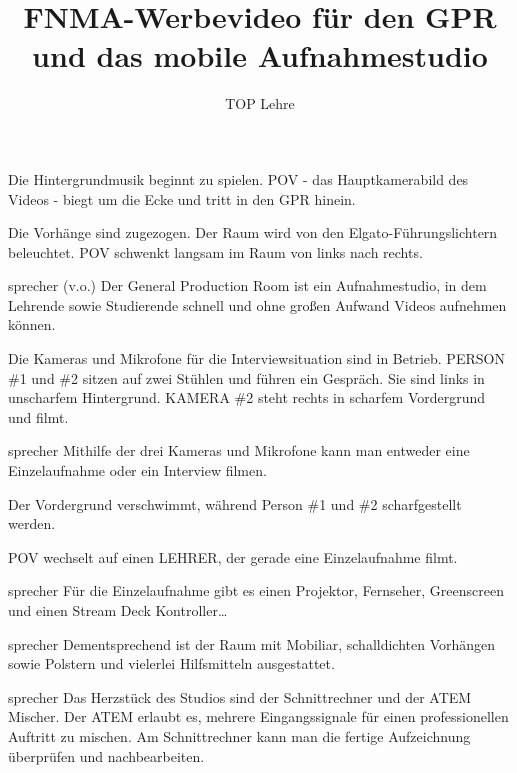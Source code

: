 \documentclass{screenplay}
\title{FNMA-Werbevideo für den GPR und das mobile Aufnahmestudio}
\author{TOP Lehre}
\begin{document}
	\coverpage
	\fadein
	
	
	Die Hintergrundmusik beginnt zu spielen. POV - das Hauptkamerabild des Videos - biegt um die Ecke und tritt in den GPR hinein.
	
	
	Die Vorhänge sind zugezogen. Der Raum wird von den Elgato-Führungslichtern beleuchtet. POV schwenkt langsam im Raum von links nach rechts.
	
	\begin{dialogue}{sprecher (v.o.)}
		Der General Production Room ist ein Aufnahmestudio, in dem Lehrende sowie Studierende schnell und ohne großen Aufwand Videos aufnehmen können.
	\end{dialogue}
	
	Die Kameras und Mikrofone für die Interviewsituation sind in Betrieb. PERSON \#1 und \#2 sitzen auf zwei Stühlen und führen ein Gespräch. Sie sind links in unscharfem Hintergrund. KAMERA \#2 steht rechts in scharfem Vordergrund und filmt.
	
	\begin{dialogue}{sprecher}
		Mithilfe der drei Kameras und Mikrofone kann man entweder eine Einzelaufnahme oder ein Interview filmen.
	\end{dialogue}
	
	Der Vordergrund verschwimmt, während Person \#1 und \#2 scharfgestellt werden.
	
	POV wechselt auf einen LEHRER, der gerade eine Einzelaufnahme filmt.
	
	\begin{dialogue}{sprecher}
		Für die Einzelaufnahme gibt es einen Projektor, Fernseher, Greenscreen und einen Stream Deck Kontroller\ldots
	\end{dialogue}
	
	\begin{dialogue}{sprecher}
		Dementsprechend ist der Raum mit Mobiliar, schalldichten Vorhängen sowie Polstern und vielerlei Hilfsmitteln ausgestattet.
	\end{dialogue}
	
	\begin{dialogue}{sprecher}
		Das Herzstück des Studios sind der Schnittrechner und der ATEM Mischer. Der ATEM erlaubt es, mehrere Eingangssignale für einen professionellen Auftritt zu mischen. Am Schnittrechner kann man die fertige Aufzeichnung überprüfen und nachbearbeiten.
	\end{dialogue}
	
\end{document}
